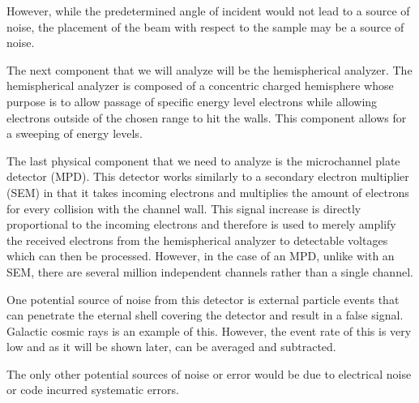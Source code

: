 \documentclass[twoside]{article}
\begin{document}
\begin{multicols}{2}
\vspace{5mm}


However, while the predetermined angle of incident would not lead to a source of noise, the placement of the beam with respect to the sample may be a source of noise.  ~~~~~~~~~~~~~~~~~~~~~~


\vspace{5mm}


The next component that we will analyze will be the hemispherical analyzer.  The hemispherical analyzer is composed of a concentric charged hemisphere whose purpose is to allow passage of specific energy level electrons while allowing electrons outside of the chosen range to hit the walls.  This component allows for a sweeping of energy levels.


\vspace{5mm}


The last physical component that we need to analyze is the microchannel plate detector (MPD).  This detector works similarly to a secondary electron multiplier (SEM) in that it takes incoming electrons and multiplies the amount of electrons for every collision with the channel wall. This signal increase is directly proportional to the incoming electrons and therefore is used to merely amplify the received electrons from the hemispherical analyzer to detectable voltages which can then be processed.  However, in the case of an MPD, unlike with an SEM, there are several million independent channels rather than a single channel.


\vspace{5mm}


One potential source of noise from this detector is external particle events that can penetrate the eternal shell covering the detector and result in a false signal.  Galactic cosmic rays is an example of this.  However, the event rate of this is very low and as it will be shown later, can be averaged and subtracted.  


\vspace{5mm}


The only other potential sources of noise or error would be due to electrical noise or code incurred systematic errors.






\end{multicols}
\end{document}
